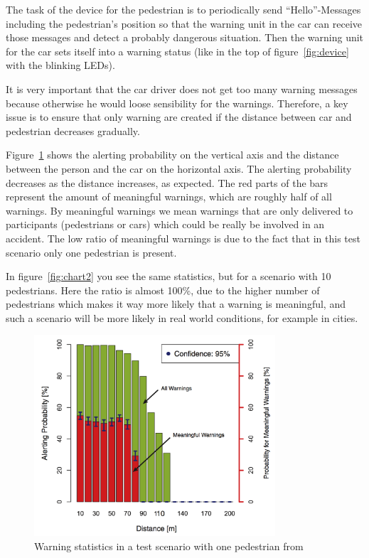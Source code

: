 \documentclass[]{ccs-thesis}
\begin{document}
The task of the device for the pedestrian is to periodically send \enquote{Hello}-Messages including the pedestrian's position so that the warning unit in the car can receive those messages and detect a probably dangerous situation. Then the warning unit for the car sets itself into a warning status (like in the top of figure~\ref{fig:device} with the blinking LEDs).

It is very important that the car driver does not get too many warning messages because otherwise he would loose sensibility for the warnings. Therefore, a key issue is to ensure that only warning are created if the distance between car and pedestrian decreases gradually.

Figure~\ref{fig:chart1} shows the alerting probability on the vertical axis and the distance between the person and the car on the horizontal axis. The alerting probability decreases as the distance increases, as expected. The red parts of the bars represent the amount of meaningful warnings, which are roughly half of all warnings. By meaningful warnings we mean warnings that are only delivered to participants (pedestrians or cars) which could be really be involved in an accident. The low ratio of meaningful warnings is due to the fact that in this test scenario only one pedestrian is present. 

In figure~\ref{fig:chart2} you see the same statistics, but for a scenario with 10 pedestrians. Here the ratio is almost 100\%, due to the higher number of pedestrians which makes it way more likely that a warning is meaningful, and such a scenario will be more likely in real world conditions, for example in cities.

\begin{figure}[h]
	\centering
	\includegraphics[width=0.8\textwidth]{figures/2_chart}
	\caption{Warning statistics in a test scenario with one pedestrian from \cite{v2pprotection}}%
	\label{fig:chart1}%
\end{figure}
\end{document}
